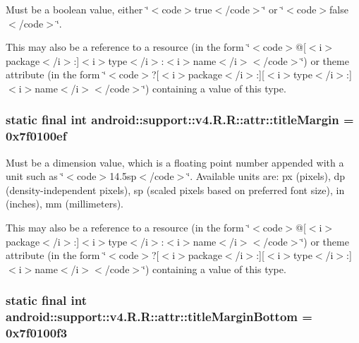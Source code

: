 Must be a boolean value, either \char`\"{}$<$code$>$true$<$/code$>$\char`\"{} or \char`\"{}$<$code$>$false$<$/code$>$\char`\"{}. 

This may also be a reference to a resource (in the form \char`\"{}$<$code$>$@\mbox{[}$<$i$>$package$<$/i$>$:\mbox{]}$<$i$>$type$<$/i$>$:$<$i$>$name$<$/i$>$$<$/code$>$\char`\"{}) or theme attribute (in the form \char`\"{}$<$code$>$?\mbox{[}$<$i$>$package$<$/i$>$:\mbox{]}\mbox{[}$<$i$>$type$<$/i$>$:\mbox{]}$<$i$>$name$<$/i$>$$<$/code$>$\char`\"{}) containing a value of this type. \hypertarget{classandroid_1_1support_1_1v4_1_1_r_1_1attr_06c66b4c492b8c046c027c3bce8ac44e}{
\subsubsection[{titleMargin}]{\setlength{\rightskip}{0pt plus 5cm}static final int android::support::v4.R.R::attr::titleMargin = 0x7f0100ef}}
\label{classandroid_1_1support_1_1v4_1_1_r_1_1attr_06c66b4c492b8c046c027c3bce8ac44e}


Must be a dimension value, which is a floating point number appended with a unit such as \char`\"{}$<$code$>$14.5sp$<$/code$>$\char`\"{}. Available units are: px (pixels), dp (density-independent pixels), sp (scaled pixels based on preferred font size), in (inches), mm (millimeters). 

This may also be a reference to a resource (in the form \char`\"{}$<$code$>$@\mbox{[}$<$i$>$package$<$/i$>$:\mbox{]}$<$i$>$type$<$/i$>$:$<$i$>$name$<$/i$>$$<$/code$>$\char`\"{}) or theme attribute (in the form \char`\"{}$<$code$>$?\mbox{[}$<$i$>$package$<$/i$>$:\mbox{]}\mbox{[}$<$i$>$type$<$/i$>$:\mbox{]}$<$i$>$name$<$/i$>$$<$/code$>$\char`\"{}) containing a value of this type. \hypertarget{classandroid_1_1support_1_1v4_1_1_r_1_1attr_125cf01c86693709e056b18508368445}{
\subsubsection[{titleMarginBottom}]{\setlength{\rightskip}{0pt plus 5cm}static final int android::support::v4.R.R::attr::titleMarginBottom = 0x7f0100f3}}
\label{classandroid_1_1support_1_1v4_1_1_r_1_1attr_125cf01c86693709e056b18508368445}


